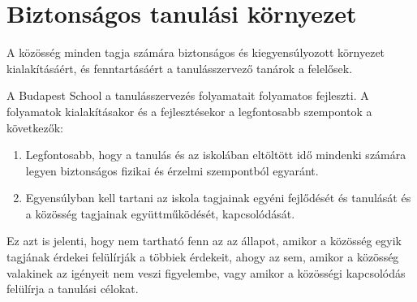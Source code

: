 \section{Biztonságos tanulási környezet}
A közösség minden tagja számára
biztonságos és kiegyensúlyozott környezet kialakításáért, és fenntartásáért a
tanulásszervező tanárok a felelősek.

A Budapest School a tanulásszervezés folyamatait folyamatos
fejleszti. A folyamatok kialakításakor és a fejlesztésekor a legfontosabb
szempontok a következők:

\begin{enumerate}

      \item Legfontosabb, hogy a tanulás és az iskolában eltöltött idő mindenki
            számára legyen biztonságos fizikai és érzelmi szempontból egyaránt.

      \item Egyensúlyban kell tartani az iskola  tagjainak egyéni fejlődését és
            tanulását és a közösség tagjainak együttműködését, kapcsolódását.

\end{enumerate}
Ez azt is jelenti, hogy nem tartható fenn az az állapot, amikor a közösség
egyik tagjának érdekei felülírják a többiek érdekeit, ahogy az sem, amikor a
közösség valakinek az igényeit nem veszi figyelembe, vagy amikor a közösségi
kapcsolódás felülírja a tanulási célokat.